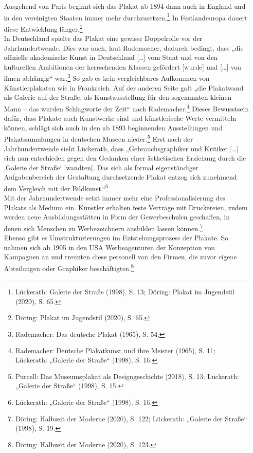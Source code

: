 \documentclass[a4paper,12pt,ngerman]{article}
\begin{document}
Ausgehend von Paris beginnt sich das Plakat ab 1894 dann auch in England und in den vereinigten Staaten immer mehr durchzusetzen.\footnote{Lückerath: Galerie der Straße (1998), S. 13; Döring: Plakat im Jugendstil (2020), S. 65.}  In Festlandeuropa dauert diese Entwicklung länger.\footnote{Döring: Plakat im Jugendstil (2020), S. 65.} \\
In Deutschland spielte das Plakat eine gewisse Doppelrolle vor der Jahrhundertwende. Dies war auch, laut Rademacher, dadurch bedingt, dass „die offizielle akademische Kunst in Deutschland […] vom Staat und von den kulturellen Ambitionen der herrschenden Klassen gefördert [wurde] und […] von ihnen abhängig“ war.\footnote{Rademacher: Das deutsche Plakat (1965), S. 54.}  So gab es kein vergleichbares Aufkommen von Künstlerplakaten wie in Frankreich. Auf der anderen Seite galt „die Plakatwand als Galerie auf der Straße, als Kunstausstellung für den sogenannten kleinen Mann – das wurden Schlagworte der Zeit“ nach Rademacher.\footnote{Rademacher: Deutsche Plakatkunst und ihre Meister (1965), S. 11; Lückerath: „Galerie der Straße“ (1998), S. 16.}  Dieses Bewusstsein dafür, dass Plakate auch Kunstwerke sind und künstlerische Werte vermitteln können, schlägt sich auch in den ab 1893 beginnenden Ausstellungen und Plakatsammlungen in deutschen Museen nieder.\footnote{Purcell: Das Museumsplakat als Designgeschichte (2018), S. 13; Lückerath: „Galerie der Straße“ (1998), S. 15.}  Erst nach der Jahrhundertwende sieht Lückerath, dass „Gebrauchsgraphiker und Kritiker […] sich nun entschieden gegen den Gedanken einer ästhetischen Erziehung durch die ‚Galerie der Straße‘ [wandten]. Das sich als formal eigenständiger Aufgabenbereich der Gestaltung durchsetzende Plakat entzog sich zunehmend dem Vergleich mit der Bildkunst.“\footnote{Lückerath: „Galerie der Straße“ (1998), S. 16.} \\
Mit der Jahrhundertwende setzt immer mehr eine Professionalisierung des Plakats als Medium ein. Künstler erhalten feste Verträge mit Druckereien, zudem werden neue Ausbildungsstätten in Form der Gewerbeschulen geschaffen, in denen sich Menschen zu Werbezeichnern ausbilden lassen können.\footnote{Döring: Halbzeit der Moderne (2020), S. 122; Lückerath: „Galerie der Straße“ (1998), S. 19.} \\
Ebenso gibt es Umstrukturierungen im Entstehungsprozess der Plakate. So nahmen sich ab 1905 in den USA Werbeagenturen der Konzeption von Kampagnen an und trennten diese personell von den Firmen, die zuvor eigene Abteilungen oder Graphiker beschäftigten.\footnote{Döring: Halbzeit der Moderne (2020), S. 123.} \\
\end{document}
